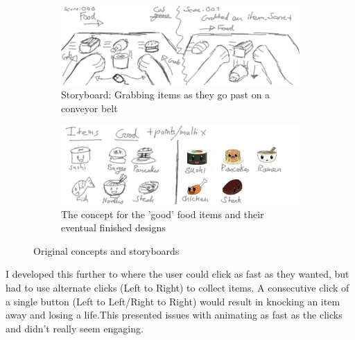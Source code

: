 \documentclass{article}
\begin{document}
\begin{figure}[H]
        \centering
        \begin{subfigure}[b]{0.8\textwidth}
                \includegraphics[width=\textwidth]{img/storyboard/original_1.png}
                \caption{Storyboard: Grabbing items as they go past on a conveyor belt}
                \label{fig:original1}
        \end{subfigure}

%
        \begin{subfigure}[b]{0.8\textwidth}
                \includegraphics[width=\textwidth]{img/storyboard/original_foods.png}
                \caption{The concept for the 'good' food items and their eventual finished designs}
                \label{fig:originalfoods}
        \end{subfigure}
        \caption{Original concepts and storyboards}\label{fig:concepts1}
\end{figure}

I developed this further to where the user could click as fast as they wanted, but had to use alternate clicks (Left to Right) to collect items. A consecutive click of a single button (Left to Left/Right to Right) would result in knocking an item away and losing a life.This presented issues with animating as fast as the clicks and didn't really seem engaging.
\end{document}
